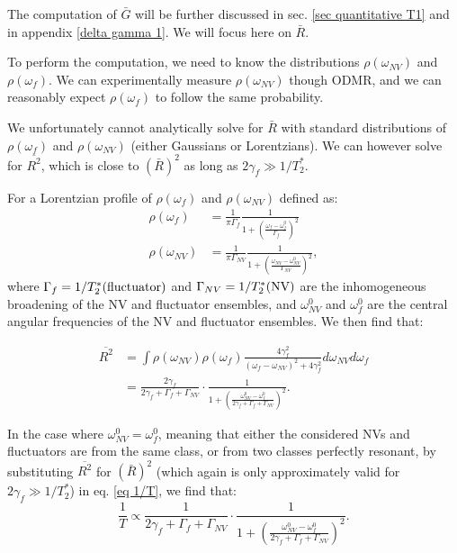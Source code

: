\documentclass[a4paper, 11pt]{report}
\begin{document}
The computation of $\bar G$ will be further discussed in sec. \ref{sec quantitative T1} and in appendix \ref{delta gamma 1}. We will focus here on $\bar R$.

To perform the computation, we need to know the distributions $\rho(\omega_{NV})$ and $\rho(\omega_{f})$. We can experimentally measure $\rho(\omega_{NV})$ though ODMR, and we can reasonably expect $\rho(\omega_{f})$ to follow the same probability.

We unfortunately cannot analytically solve for $\bar R$ with standard distributions of $\rho(\omega_{f})$ and $\rho(\omega_{NV})$ (either Gaussians or Lorentzians). We can however solve for $\overline{R^2}$, which is close to $(\bar{R})^2$ as long as $2 \gamma_f \gg 1/T_2^*$.

For a Lorentzian profile of $\rho(\omega_{f})$ and $\rho(\omega_{NV})$ defined as:
\begin{align*}
\rho(\omega_{f})&=\frac{1}{\pi \Gamma_f} \frac{1}{1+ \left(\frac{\omega_f-\omega^0_f}{\Gamma_f}\right)^2} \\
\rho(\omega_{NV})&=\frac{1}{\pi \Gamma_{NV}} \frac{1}{1+ \left(\frac{\omega_{NV}-\omega^0_{NV}}{\Gamma_{NV}}\right)^2},
\end{align*}
where $\Gamma_{f}=1/T_2^*(\rm fluctuator)$ and $\Gamma_{NV}=1/T_2^*(\rm NV)$ are the inhomogeneous broadening of the NV and fluctuator ensembles, and $\omega^0_{NV}$ and $\omega^0_{f}$ are the central angular frequencies of the NV and fluctuator ensembles. We then find that:

\begin{align*}
\overline{R^2}&= \int \rho(\omega_{NV}) \rho(\omega_{f}) \frac{4\gamma_f^2}{(\omega_f - \omega_{NV})^2+4\gamma_f^2} d\omega_{NV} d\omega_{f} \\
&=\frac{2 \gamma_f}{2 \gamma_f + \Gamma_f + \Gamma_{NV}} \cdot \frac{1}{1+\left(\frac{\omega^0_{NV}-\omega^0_{f}}{2 \gamma_f + \Gamma_f + \Gamma_{NV}}\right)^2}.
\end{align*}

In the case where $\omega^0_{NV}=\omega^0_{f}$, meaning that either the considered NVs and fluctuators are from the same class, or from two classes perfectly resonant, by substituting $\overline{R ^2}$ for $(\bar{R})^2$ (which again is only approximately valid for $2 \gamma_f \gg 1/T_2^*$) in eq. \ref{eq 1/T}, we find that:
\begin{equation}
\label{eq 1/T avec T2*}
\frac{1}{T} \propto \frac{1}{2\gamma_f + \Gamma_f + \Gamma_{NV}}\cdot \frac{1}{1+\left(\frac{\omega^0_{NV}-\omega^0_{f}}{2 \gamma_f + \Gamma_f + \Gamma_{NV}}\right)^2}.
\end{equation}
\end{document}
